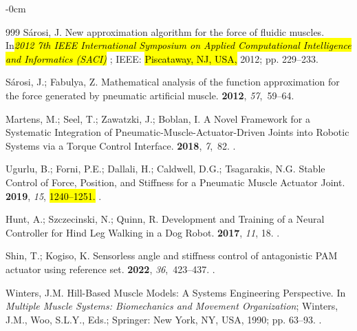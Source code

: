 \documentclass[actuators,article,accept,pdftex,moreauthors]{Definitions/mdpi}
\begin{document}
\begin{adjustwidth}{-\extralength}{0cm}
\begin{thebibliography}{999}
Sárosi, J.
\newblock New approximation algorithm for the force of fluidic muscles.
\newblock In\emph{\hl{2012 7th IEEE International Symposium on Applied Computational Intelligence and Informatics (SACI)}%
}; IEEE: \hl{Piscataway, NJ, USA,}
   2012; pp. 229--233.

Sárosi, J.; Fabulya, Z.
\newblock Mathematical analysis of the function approximation for the force
  generated by pneumatic artificial muscle.
 {\bf 2012}, {\em 57},~59--64.

Martens, M.; Seel, T.; Zawatzki, J.; Boblan, I.
\newblock A {Novel} {Framework} for a {Systematic} {Integration} of
  {Pneumatic}-{Muscle}-{Actuator}-{Driven} {Joints} into {Robotic} {Systems}
  {via} a {Torque} {Control} {Interface}.
 {\bf 2018}, {\em 7},~82.
.

Ugurlu, B.; Forni, P.E.; Dallali, H.; Caldwell, D.G.; Tsagarakis, N.G.
\newblock Stable {Control} of {Force}, {Position}, and {Stiffness} for a
  {Pneumatic} {Muscle} {Actuator} {Joint}.
 {\bf 2019}, {\em
  15}, \hl{1240--1251.} %
.

Hunt, A.; Szczecinski, N.; Quinn, R.
\newblock Development and {Training} of a {Neural} {Controller} for {Hind}
  {Leg} {Walking} in a {Dog} {Robot}.
 {\bf 2017}, {\em 11}, 18.
.

Shin, T.; Kogiso, K.
\newblock Sensorless angle and stiffness control of antagonistic {PAM} actuator
  using reference set.
 {\bf 2022}, {\em 36},~423--437.
.

Winters, J.M.
\newblock Hill-{Based} {Muscle} {Models}: {A} {Systems} {Engineering}
  {Perspective}. In {\em Multiple {Muscle} {Systems}: {Biomechanics} and
  {Movement} {Organization}};  Winters, J.M., Woo, S.L.Y., Eds.;
  Springer: New York, NY,  USA, 1990; pp. 63--93.
.


\end{thebibliography}
\end{adjustwidth}
\end{document}
